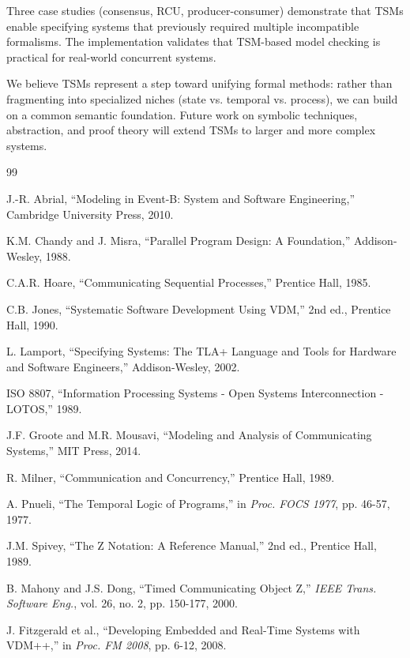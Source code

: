 \documentclass[conference]{IEEEtran}
\begin{document}
Three case studies (consensus, RCU, producer-consumer) demonstrate that TSMs enable specifying systems that previously required multiple incompatible formalisms. The implementation validates that TSM-based model checking is practical for real-world concurrent systems.

We believe TSMs represent a step toward unifying formal methods: rather than fragmenting into specialized niches (state vs. temporal vs. process), we can build on a common semantic foundation. Future work on symbolic techniques, abstraction, and proof theory will extend TSMs to larger and more complex systems.

\begin{thebibliography}{99}

J.-R. Abrial, ``Modeling in Event-B: System and Software Engineering,'' Cambridge University Press, 2010.

K.M. Chandy and J. Misra, ``Parallel Program Design: A Foundation,'' Addison-Wesley, 1988.

C.A.R. Hoare, ``Communicating Sequential Processes,'' Prentice Hall, 1985.

C.B. Jones, ``Systematic Software Development Using VDM,'' 2nd ed., Prentice Hall, 1990.

L. Lamport, ``Specifying Systems: The TLA+ Language and Tools for Hardware and Software Engineers,'' Addison-Wesley, 2002.

ISO 8807, ``Information Processing Systems - Open Systems Interconnection - LOTOS,'' 1989.

J.F. Groote and M.R. Mousavi, ``Modeling and Analysis of Communicating Systems,'' MIT Press, 2014.

R. Milner, ``Communication and Concurrency,'' Prentice Hall, 1989.

A. Pnueli, ``The Temporal Logic of Programs,'' in \textit{Proc. FOCS 1977}, pp. 46-57, 1977.

J.M. Spivey, ``The Z Notation: A Reference Manual,'' 2nd ed., Prentice Hall, 1989.

B. Mahony and J.S. Dong, ``Timed Communicating Object Z,'' \textit{IEEE Trans. Software Eng.}, vol. 26, no. 2, pp. 150-177, 2000.

J. Fitzgerald et al., ``Developing Embedded and Real-Time Systems with VDM++,'' in \textit{Proc. FM 2008}, pp. 6-12, 2008.

\end{thebibliography}
\end{document}
